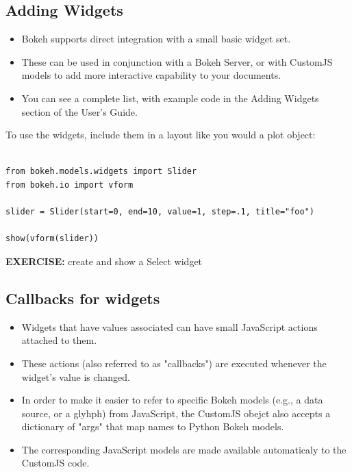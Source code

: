 \documentclass[a4paper,12pt]{article}
\begin{document}
\subsection*{Adding Widgets}
\begin{itemize}
\item Bokeh supports direct integration with a small basic widget set. 
\item These can be used in conjunction with a Bokeh Server, or with CustomJS models to add more interactive capability to your documents. 
\item You can see a complete list, with example code in the Adding Widgets section of the User's Guide.
\end{itemize}


To use the widgets, include them in a layout like you would a plot object:
\begin{framed}
	\begin{verbatim}

from bokeh.models.widgets import Slider
from bokeh.io import vform

slider = Slider(start=0, end=10, value=1, step=.1, title="foo")

show(vform(slider))

\end{verbatim}
\end{framed}
\noindent \textbf{EXERCISE:} create and show a Select widget 
\subsection{Callbacks for widgets}
\begin{itemize}
\item Widgets that have values associated can have small JavaScript actions attached to them. 
\item These actions (also referred to as "callbacks") are executed whenever the widget's value is changed. 
\item In order to make it easier to refer to specific Bokeh models (e.g., a data source, or a glyhph) from JavaScript, the CustomJS obejct also accepts a dictionary of "args" that map names to Python Bokeh models. 
\item The corresponding JavaScript models are made available automaticaly to the CustomJS code.
\end{itemize}
\end{document}
